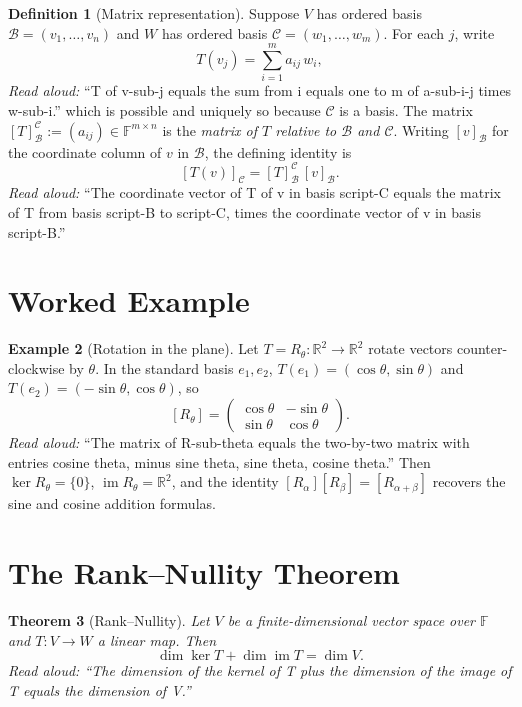 \documentclass[11pt]{article}
\theoremstyle{plain}
\newtheorem{theorem}{Theorem}
\theoremstyle{definition}
\newtheorem{definition}[theorem]{Definition}
\newtheorem{example}[theorem]{Example}
\DeclareMathOperator{\im}{im}
\begin{document}
\begin{definition}[Matrix representation]
Suppose $V$ has ordered basis $\mathcal{B} = (v_1, \dots, v_n)$ and $W$ has
ordered basis $\mathcal{C} = (w_1, \dots, w_m)$. For each $j$, write
\[
T(v_j) = \sum_{i=1}^m a_{ij}\, w_i,
\]
\emph{Read aloud:} ``T of v-sub-j equals the sum from i equals one to m of a-sub-i-j times w-sub-i.''
which is possible and uniquely so because $\mathcal{C}$ is a basis. The
matrix $[T]_{\mathcal{B}}^{\mathcal{C}} := (a_{ij}) \in \mathbb{F}^{m\times n}$
is the \emph{matrix of $T$ relative to $\mathcal{B}$ and $\mathcal{C}$}.
Writing $[v]_{\mathcal{B}}$ for the coordinate column of $v$ in $\mathcal{B}$,
the defining identity is
\[
[T(v)]_{\mathcal{C}} = [T]_{\mathcal{B}}^{\mathcal{C}} \, [v]_{\mathcal{B}}.
\]
\emph{Read aloud:} ``The coordinate vector of T of v in basis script-C equals the matrix of T from basis script-B to script-C, times the coordinate vector of v in basis script-B.''
\end{definition}

\section{Worked Example}

\begin{example}[Rotation in the plane]
Let $T = R_\theta \colon \mathbb{R}^2 \to \mathbb{R}^2$ rotate vectors
counter-clockwise by $\theta$. In the standard basis $e_1, e_2$,
$T(e_1) = (\cos\theta, \sin\theta)$ and $T(e_2) = (-\sin\theta, \cos\theta)$,
so
\[
[R_\theta] = \begin{pmatrix} \cos\theta & -\sin\theta \\
\sin\theta & \cos\theta \end{pmatrix}.
\]
\emph{Read aloud:} ``The matrix of R-sub-theta equals the two-by-two matrix with entries cosine theta, minus sine theta, sine theta, cosine theta.''
Then $\ker R_\theta = \{0\}$, $\im R_\theta = \mathbb{R}^2$, and the identity
$[R_\alpha][R_\beta] = [R_{\alpha+\beta}]$ recovers the sine and cosine
addition formulas.
\end{example}

\section{The Rank--Nullity Theorem}

\begin{theorem}[Rank--Nullity]\label{thm:rank-nullity}
Let $V$ be a finite-dimensional vector space over $\mathbb{F}$ and
$T \colon V \to W$ a linear map. Then
\[
\dim \ker T + \dim \im T = \dim V.
\]
\emph{Read aloud:} ``The dimension of the kernel of T plus the dimension of the image of T equals the dimension of V.''
\end{theorem}
\end{document}
